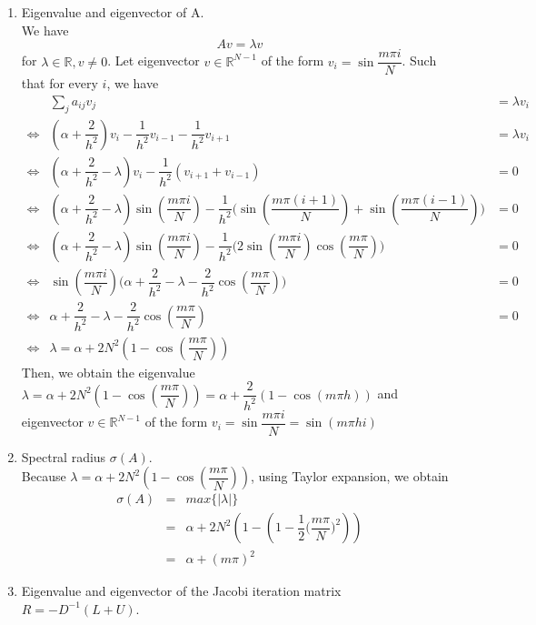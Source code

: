 \documentclass[a4paper,10pt]{article}
\newcommand{\R}{\mathbb{R}}
\begin{document}
	\begin{enumerate}[label=(\alph*)]
		\item Eigenvalue and eigenvector of A.\\
		We have \[ Av = \lambda v \]
		for $ \lambda\in\R, v\neq0 $. Let eigenvector $ v\in\R^{N-1} $ of the form $ v_{i} = \sin \dfrac{m\pi i}{N} $. Such that for every $ i $, we have
		\begin{eqnarray}\nonumber
		&\sum\limits_{j} a_{ij} v_{j} &= \lambda v_{i} \\ \nonumber
		\Leftrightarrow & (\alpha + \dfrac{2}{h^2}) v_{i} - \dfrac{1}{h^2}v_{i-1}-\dfrac{1}{h^2}v_{i+1} &= \lambda v_{i}\\ \nonumber
		\Leftrightarrow & (\alpha+\dfrac{2}{h^2}-\lambda) v_{i} -\dfrac{1}{h^2}(v_{i+1}+v_{i-1}) & =0 \\ \nonumber
		\Leftrightarrow & (\alpha+\dfrac{2}{h^2}-\lambda) \sin(\dfrac{m\pi i }{N}) - \dfrac{1}{h^2}\Big(\sin(\dfrac{m \pi (i+1)}{N})+\sin(\dfrac{m \pi (i-1)}{N})\Big)& =0 \\ \nonumber
		\Leftrightarrow & (\alpha+\dfrac{2}{h^2}-\lambda) \sin(\dfrac{m\pi i }{N}) - \dfrac{1}{h^2}\Big(2 \sin(\dfrac{m\pi i}{N})\cos(\dfrac{m\pi}{N})\Big)& =0 \\ \nonumber
		\Leftrightarrow & \sin(\dfrac{m\pi i}{N}) \big(\alpha+\dfrac{2}{h^2}-\lambda-\dfrac{2}{h^2}\cos(\dfrac{m\pi}{N})\big) &=0 \\ \nonumber
		\Leftrightarrow & \alpha+\dfrac{2}{h^2}-\lambda-\dfrac{2}{h^2}\cos(\dfrac{m\pi}{N}) &=0 \\ \nonumber
		\Leftrightarrow & \lambda = \alpha + 2N^2(1-\cos(\dfrac{m\pi}{N}))
		\end{eqnarray}
		Then, we obtain the eigenvalue $  \lambda = \alpha + 2N^2(1-\cos(\dfrac{m\pi}{N})) = \alpha + \dfrac{2}{h^2}(1-\cos(m\pi h)) $ and eigenvector $ v\in\R^{N-1} $ of the form $ v_{i} = \sin \dfrac{m\pi i}{N} = \sin(m\pi h i) $
		\item Spectral radius $ \sigma(A) $.\\
		Because $  \lambda = \alpha + 2N^2(1-\cos(\dfrac{m\pi}{N})) $, using Taylor expansion, we obtain
		\begin{eqnarray}\nonumber
		\sigma(A) &=& max\{|\lambda|\} \\ \nonumber
		&=& \alpha + 2N^2(1-(1-\dfrac{1}{2}\big(\dfrac{m\pi}{N}\big)^2)) \\ \nonumber
		&=& \alpha + (m\pi)^2
		\end{eqnarray}
		\item Eigenvalue and eigenvector of the Jacobi iteration matrix $ R = -D^{-1}(L+U) $.\\

\end{enumerate}
\end{document}
